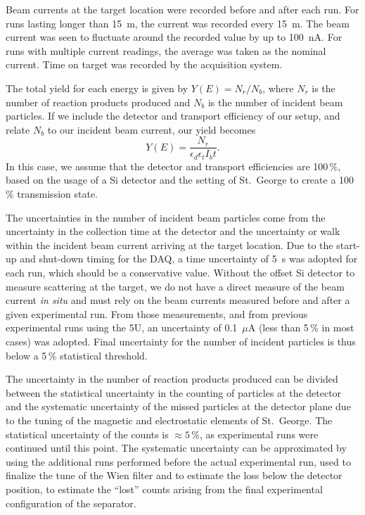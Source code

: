 Beam currents at the target location were recorded before and after each run.
For runs lasting longer than 15~m, the current was recorded every 15~m. The
beam current was seen to fluctuate around the recorded value by up to 100~nA.
For runs with multiple current readings, the average was taken as the nominal
current. Time on target was recorded by the acquisition system.

The total yield for each energy is given by $Y(E) = N_r / N_b$, where $N_r$ is
the number of reaction products produced and $N_b$ is the number of incident
beam particles. If we include the detector and transport efficiency of our
setup, and relate $N_b$ to our incident beam current, our yield becomes
\begin{equation}
    \label{eq:yield}
    Y(E) = \frac{N_r}{\epsilon_d\epsilon_tI_bt}.
\end{equation}
In this case, we assume that the detector and transport efficiencies are
100\,\%, based on the usage of a Si detector and the setting of St.\ George
to create a 100\,\% transmission state.

The uncertainties in the number of incident beam particles come from the
uncertainty in the collection time at the detector and the uncertainty or
walk within the incident beam current arriving at the target location.
Due to the start-up and shut-down timing for the DAQ, a time uncertainty of
5~s was adopted for each run, which should be a conservative value.
Without the offset Si detector to measure scattering at the target, we
do not have a direct measure of the beam current \textit{in situ} and must
rely on the beam currents measured before and after a given experimental run.
From those measurements, and from previous experimental runs using the 5U,
an uncertainty of 0.1~$\mu$A (less than 5\,\% in most cases) was adopted.
Final uncertainty for the number of incident particles is thus below a 5\,\%
statistical threshold.


The uncertainty in the number of reaction products produced can be divided
between the statistical uncertainty in the counting of particles at the
detector and the systematic uncertainty of the missed particles at the
detector plane due to the tuning of the magnetic and electrostatic elements
of St.\ George. The statistical uncertainty of the counts is $\approx 5$\,\%,
as experimental runs were continued until this point. The systematic uncertainty
can be approximated by using the additional runs performed before the actual
experimental run, used to finalize the tune of the Wien filter and to estimate
the loss below the detector position, to estimate the ``lost'' counts
arising from the final experimental configuration of the separator.

